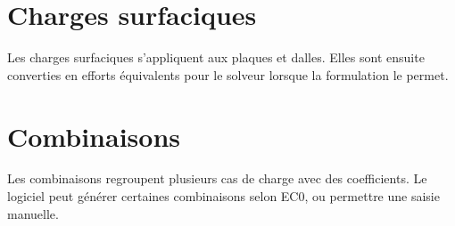 \section{Charges surfaciques}

Les charges surfaciques s'appliquent aux plaques et dalles. Elles sont ensuite
converties en efforts équivalents pour le solveur lorsque la formulation le
permet.

\section{Combinaisons}

Les combinaisons regroupent plusieurs cas de charge avec des coefficients. Le
logiciel peut générer certaines combinaisons selon EC0, ou permettre une saisie
manuelle.

